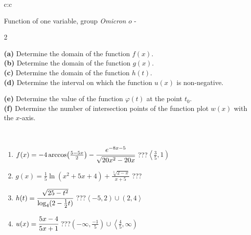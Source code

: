 \documentclass[10pt]{report}
\newcommand\omicron{o}
\begin{document}
\begin{tabular}{c:c}
\begin{minipage}[c][104.5mm][t]{0.5\linewidth}
\begin{center}
\vspace{7mm}
{\huge Function of one variable, group \textit{Omicron $\omicron$} -}\\[5mm]
\begin{minipage}{0.95\linewidth}
\begin{center}
{\small \begin{multicols}{2} \raggedright
\textbf{(a)} Determine the domain of the function \(f(x)\). \\[1mm]
\textbf{(b)} Determine the domain of the function \(g(x)\). \\[1mm]
\textbf{(c)} Determine the domain of the function \(h(t)\). \\[1mm]
\textbf{(d)} Determine the interval on which the function \(u(x)\) is non-negative. \par \columnbreak
\textbf{(e)} Determine the value of the function \(\varphi(t)\) at the point \(t_0\). \\[1mm]
\textbf{(f)} Determine the number of intersection points of the function plot \(w(x)\) with the \(x\)-axis. \\[1mm]
\end{multicols}
}
\end{center}
\end{minipage}
\\[4mm]
\begin{minipage}{0.79\linewidth}
\begin{center}
\begin{varwidth}{\linewidth}
\begin{enumerate}
\small
\item $f(x) = -4\arccos\!\left( \frac{5-5x}{2} \right) - \cfrac{e^{-8x-5}}{\sqrt{20x^2-20x}}$\quad \dotfill\; ???\;\dotfill \quad $\left\langle\frac{3}{5} , 1\right)$
\item $g(x) = \frac{1}{5} \ln{\!(x^2+5x+4)}+\frac{\sqrt[3]{2-x}}{x+5}$\quad \dotfill\; ???\;\dotfill {}
\item $h(t) = \cfrac{\sqrt{25-t^2}}{\log_4(2-\frac{1}{2}t)}$\quad \dotfill\; ???\;\dotfill \quad $\left\langle-5 , 2\right)\cup\left(2 , 4\right\rangle$
\item $u(x) = \cfrac{5x-4}{5x+1}$\quad \dotfill\; ???\;\dotfill \quad $\left(-\infty , \frac{-1}{5}\right)\cup\left\langle\frac{4}{5} , \infty\right)$

\end{enumerate}
\end{varwidth}
\end{center}
\end{minipage}
\end{center}
\end{minipage}
\end{tabular}
\end{document}

